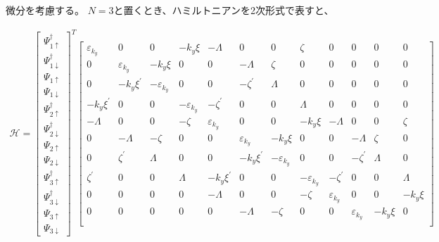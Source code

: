 \documentclass{jsarticle}
\begin{document}
            微分を考慮する。
		    $N=3$と置くとき、ハミルトニアンを2次形式で表すと、

		    \begin{align}
		    	\mathcal{H}=
		    	\begin{bmatrix}
		    		\Psi_{1\uparrow}^\dagger \\
		    		\Psi_{1\downarrow}^\dagger \\
		    		\Psi_{1\uparrow} \\
		    		\Psi_{1\downarrow} \\
		    		\Psi_{2\uparrow}^\dagger \\
		    		\Psi_{2\downarrow}^\dagger \\
		    		\Psi_{2\uparrow} \\
		    		\Psi_{2\downarrow} \\
		    		\Psi_{3\uparrow}^\dagger \\
		    		\Psi_{3\downarrow}^\dagger \\
		    		\Psi_{3\uparrow} \\
		    		\Psi_{3\downarrow}
		    	\end{bmatrix}
		    	^T
		    	\begin{bmatrix}
		    		\varepsilon_{k_y} & 0 & 0 & -k_y\xi & -\varLambda & 0 & 0 & \zeta & 0 & 0 & 0 & 0 \\
		    		0 & \varepsilon_{k_y} & -k_y\xi & 0 & 0 & -\varLambda & \zeta & 0 & 0 & 0 & 0 & 0 \\
		    		0 & -k_y\xi^{'} & -\varepsilon_{k_y} & 0 & 0 & -\zeta^{'} & \varLambda & 0 & 0 & 0 & 0 & 0 \\
		    		-k_y\xi^{'} & 0 & 0 & -\varepsilon_{k_y} & -\zeta^{'} & 0 & 0 & \varLambda & 0 & 0 & 0 & 0 \\
		    		-\varLambda & 0 & 0 & -\zeta & \varepsilon_{k_y} & 0 & 0 & -k_y\xi & -\varLambda & 0 & 0 & \zeta \\
		    		0 & -\varLambda & -\zeta & 0 & 0 & \varepsilon_{k_y} & -k_y\xi & 0 & 0 & -\varLambda & \zeta & 0 \\
		    		0 & \zeta^{'} & \varLambda & 0 & 0 & -k_y\xi^{'} & -\varepsilon_{k_y} & 0 & 0 & -\zeta^{'} & \varLambda & 0 \\
		    		\zeta^{'} & 0 & 0 & \varLambda & -k_y\xi^{'} & 0 & 0 & -\varepsilon_{k_y} & -\zeta^{'} & 0 & 0 & \varLambda \\
		    		0 & 0 & 0 & 0 & -\varLambda & 0 & 0 & -\zeta & \varepsilon_{k_y} & 0 & 0 & -k_y\xi \\
		    		0 & 0 & 0 & 0 & 0 & -\varLambda & -\zeta & 0 & 0 & \varepsilon_{k_y} & -k_y\xi & 0 \\

\end{bmatrix}
\end{align}
\end{document}
